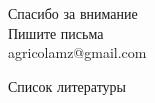\section{}
\begin{frame}
{\huge Спасибо за внимание\bigskip\\
\normalsize Пишите письма\\
agricolamz@gmail.com
\vspace{-130pt}}
\end{frame}
\begin{frame}{Список литературы}
\footnotesize


\end{frame}
